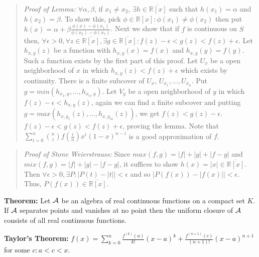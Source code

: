 \begin{quote}
\emph{Proof of Lemma:} $\forall \alpha, \beta$, if $x_1 \ne x_2$, $\exists h \in {\overline {{\mathbb R}[x]}}$ such that
$h(x_1) = \alpha$ and $h(x_2) = \beta$.  To show this, pick $\phi \in {\mathbb R}[x]: \phi(x_1) \ne \phi(x_2)$ then put
$h(x) = \alpha + \beta {\frac {\phi(x) - \phi (x_1)} {\phi(x_2) - \phi (x_1)}}$.
Next we show that if $f$ is continuous on $S$ then, $\forall \epsilon > 0, \forall z \in {\overline {{\mathbb R}[x]}},
\exists g \in {\overline {{\mathbb R}[x]}}: f(z) - \epsilon < g(z) < f(z) + \epsilon$.  Let $h_{x,y}(z)$ be a function
with $h_{x,y}(x) = f(x)$ and $h_{x,y}(y) = f(y)$.  Such a function exists by the first part of this proof.
Let $U_x$ be a open neighborhood of $x$ in which $h_{x,y}(z) < f(z) + \epsilon$ which exists by continuity.
There is a finite subcover of $U_x$, $U_{x_1}, \ldots , U_{x_n}$.  Put $g = min(h_{x_1, y}, \ldots, h_{x_n, y})$.
Let $V_y$ be a open neighborhood of $y$ in which $f(z) - \epsilon < h_{x,y}(z)$, again we can find a finite
subcover and putting $g = max(h_{x,y_1}(z), \ldots, h_{x,y_m}(z))$, we get $f(z) < g(z) - \epsilon$.
$f(z) - \epsilon < g(z) < f(z) + \epsilon$, proving the lemma.
Note that $\sum_{i=0}^n {n \choose i} f({\frac {i}{n}}) x^i (1-x)^{n-i}$ is a good approximation of $f$.
\end{quote}
\begin{quote}
\emph{Proof of Stone Weierstrauss:} 
Since 
$max(f,g) = |f| + |g| + |f - g|$ 
and
$mix(f,g) = |f| + |g| - |f - g|$, it suffices to show $h(x) = |x| \in {\overline {{\mathbb R}[x]}}$.
Then $\forall \epsilon > 0, \exists P : |P(t) - |t|| < \epsilon$ and so $|P(f(x)) - |f(x)|| < \epsilon$.
Thus, $P(f(x)) \in {\overline {{\mathbb R}[x]}}$.
\end{quote}
{\bf Theorem:} Let ${\cal A}$ be an algebra of real continuous functions on a compact set $K$.   If
${\cal A}$ separates points and vanishes at no point then the uniform closure of ${\cal A}$ consists of all
real continuous functions.
\begin{quote}
\end{quote}
{\bf Taylor's Theorem:} $f(x)= \sum_{k=0}^n{\frac {f^{(k)}(a)} {k!}} (x-a)^k
+ {\frac {f^{(n+1)}(c)} {(n+1)!}}(x-a)^{n+1}$ for some $c: a<c<x$.
